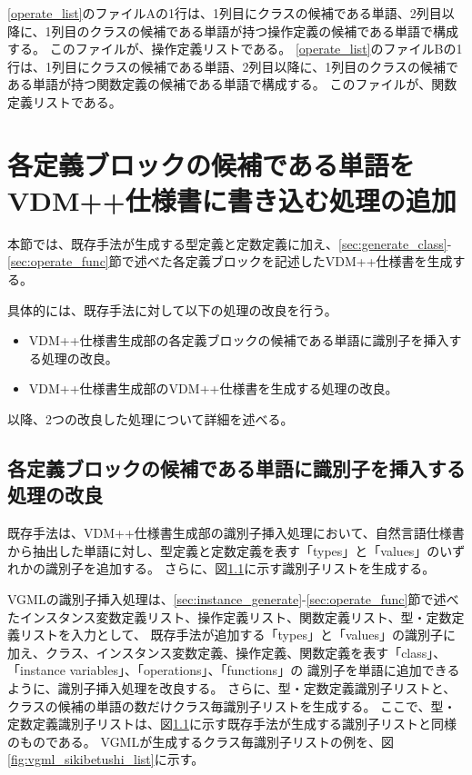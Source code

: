 \ref{operate_list}のファイルAの1行は、1列目にクラスの候補である単語、2列目以降に、1列目のクラスの候補である単語が持つ操作定義の候補である単語で構成する。
このファイルが、操作定義リストである。
\ref{operate_list}のファイルBの1行は、1列目にクラスの候補である単語、2列目以降に、1列目のクラスの候補である単語が持つ関数定義の候補である単語で構成する。
このファイルが、関数定義リストである。

\section{各定義ブロックの候補である単語をVDM++仕様書に書き込む処理の追加}
本節では、既存手法が生成する型定義と定数定義に加え、\ref{sec:generate_class}-\ref{sec:operate_func}節で述べた各定義ブロックを記述したVDM++仕様書を生成する。

具体的には、既存手法に対して以下の処理の改良を行う。

\begin{itemize}
    \item VDM++仕様書生成部の各定義ブロックの候補である単語に識別子を挿入する処理の改良。
    \item VDM++仕様書生成部のVDM++仕様書を生成する処理の改良。
\end{itemize}

以降、2つの改良した処理について詳細を述べる。

\subsection{各定義ブロックの候補である単語に識別子を挿入する処理の改良}
既存手法は、VDM++仕様書生成部の識別子挿入処理において、自然言語仕様書から抽出した単語に対し、型定義と定数定義を表す「types」と「values」のいずれかの識別子を追加する。
さらに、図\ref{}に示す識別子リストを生成する。

VGMLの識別子挿入処理は、\ref{sec:instance_generate}-\ref{sec:operate_func}節で述べたインスタンス変数定義リスト、操作定義リスト、関数定義リスト、型・定数定義リストを入力として、
既存手法が追加する「types」と「values」の識別子に加え、クラス、インスタンス変数定義、操作定義、関数定義を表す「class」、「instance variables」、「operations」、「functions」の
識別子を単語に追加できるように、識別子挿入処理を改良する。
さらに、型・定数定義識別子リストと、クラスの候補の単語の数だけクラス毎識別子リストを生成する。
ここで、型・定数定義識別子リストは、図\ref{}に示す既存手法が生成する識別子リストと同様のものである。
VGMLが生成するクラス毎識別子リストの例を、図\ref{fig:vgml_sikibetushi_list}に示す。

